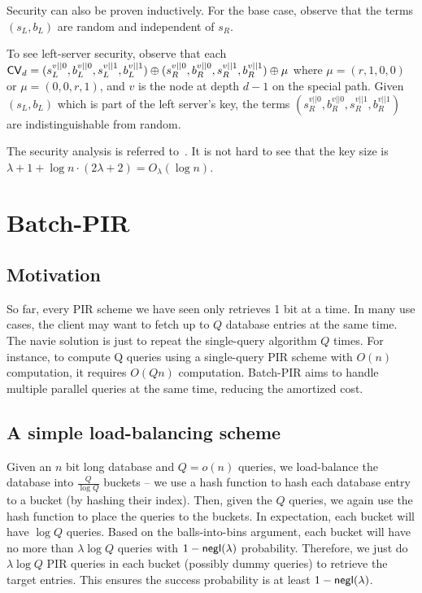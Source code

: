 Security can also be proven inductively.
For the base case, observe that the terms $(s_L, b_L)$  are random
and independent of $s_R$. 

To see left-server security, observe
that each ${\sf CV}_d = 
(s_L^{v||0}, b_L^{v||0}, s_L^{v||1}, b_L^{v||1}) \oplus 
(s_R^{v||0}, b_R^{v||0}, s_R^{v||1}, b_R^{v||1}) \oplus 
\mu$
where $\mu = (r, 1, 0, 0)$ or $\mu = (0, 0, r, 1)$,
and $v$ is the node at depth $d-1$ on the special path.
Given $(s_L, b_L)$ which is part of the left server's key,
the terms $(s_R^{v||0}, b_R^{v||0}, s_R^{v||1}, b_R^{v||1})$
are indistinguishable from random. 


The security analysis is referred to~\cite{boyle2016function}. 
It is not hard to see that 
the key size is $\lambda+1+\log n\cdot (2\lambda+2)=O_\lambda(\log n)$.



 \section{Batch-PIR}

 \subsection{Motivation}
    So far, every PIR scheme we have seen only retrieves 1 bit at a time. 
    In many use cases, the client may want to fetch up to $Q$ database entries at the same time. 
    The navie solution is just to repeat the single-query algorithm $Q$ times.
    For instance, to compute Q queries using a single-query PIR scheme with $O(n)$ computation, it requires $O(Qn)$ computation.
    Batch-PIR aims to handle multiple parallel queries at the same time, reducing the
     amortized cost.
     
     
\subsection{A simple load-balancing scheme}

Given an $n$ bit long database and $Q=o(n)$ queries, we load-balance the database into $\frac{Q}{\log Q}$ buckets -- we use a hash function to hash each database entry to a bucket (by hashing their index).
Then, given the $Q$ queries, we again use the hash function to place the queries to the buckets. 
In expectation, each bucket will have $\log Q$ queries. 
Based on the balls-into-bins argument, each bucket will have no more than $\lambda \log Q$ queries with $1-{\sf negl}(\lambda)$ probability.
Therefore, we just do $\lambda \log Q$ PIR queries in each bucket (possibly dummy queries) to retrieve the target entries. 
This ensures the success probability is at least $1-{\sf negl}(\lambda)$.

